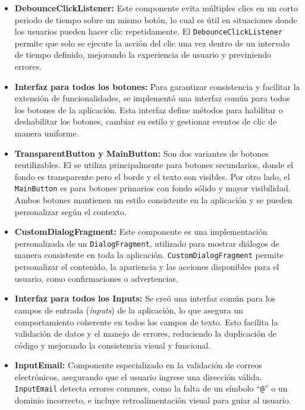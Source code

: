 \begin{itemize}
    \item \textbf{DebounceClickListener:} Este componente evita múltiples clics en un corto periodo de tiempo sobre un mismo botón, lo cual es útil en situaciones donde los usuarios pueden hacer clic repetidamente. El \texttt{DebounceClickListener} permite que solo se ejecute la acción del clic una vez dentro de un intervalo de tiempo definido, mejorando la experiencia de usuario y previniendo errores.

    \item \textbf{Interfaz para todos los botones:} Para garantizar consistencia y facilitar la extensión de funcionalidades, se implementó una interfaz común para todos los botones de la aplicación. Esta interfaz define métodos para habilitar o deshabilitar los botones, cambiar su estilo y gestionar eventos de clic de manera uniforme.

    \item \textbf{TransparentButton y MainButton:} Son dos variantes de botones reutilizables. El \texttt{} se utiliza principalmente para botones secundarios, donde el fondo es transparente pero el borde y el texto son visibles. Por otro lado, el \texttt{MainButton} es para botones primarios con fondo sólido y mayor visibilidad. Ambos botones mantienen un estilo consistente en la aplicación y se pueden personalizar según el contexto.


    \item \textbf{CustomDialogFragment:} Este componente es una implementación personalizada de un \texttt{DialogFragment}, utilizado para mostrar diálogos de manera consistente en toda la aplicación. \texttt{CustomDialogFragment} permite personalizar el contenido, la apariencia y las acciones disponibles para el usuario, como confirmaciones o advertencias.

    \item \textbf{Interfaz para todos los Inputs:} Se creó una interfaz común para los campos de entrada (\textit{inputs}) de la aplicación, lo que asegura un comportamiento coherente en todos los campos de texto. Esto facilita la validación de datos y el manejo de errores, reduciendo la duplicación de código y mejorando la consistencia visual y funcional.

    \item \textbf{InputEmail:} Componente especializado en la validación de correos electrónicos, asegurando que el usuario ingrese una dirección válida. \texttt{InputEmail} detecta errores comunes, como la falta de un símbolo ``\texttt{@}'' o un dominio incorrecto, e incluye retroalimentación visual para guiar al usuario.


\end{itemize}
